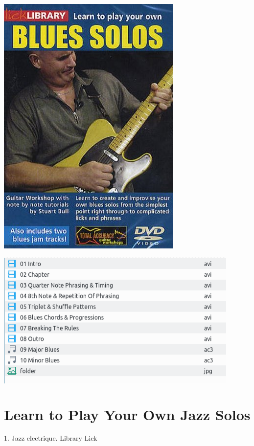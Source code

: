 \documentclass[a4paper]{book}
\begin{document}
\begin{center}
\includegraphics[width=9.155cm,height=13.229cm]{lebluessupportsmethodes-img133.jpg}
\end{center}





\begin{center}
\includegraphics[width=12.01cm,height=6.824cm]{lebluessupportsmethodes-img134.png}
\end{center}



\clearpage


\section[Learn to Play Your Own Jazz Solos]{Learn to Play Your Own
Jazz Solos}
\hypertarget{RefHeadingToc184973218262}{}1. Jazz electrique. Library
Lick
\end{document}
